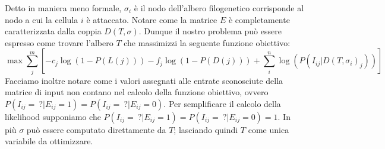 \documentclass{report}
\begin{document}
  Detto in maniera meno formale, ${\sigma}_{i}$ è il nodo dell'albero filogenetico corrisponde al nodo a cui la cellula $i$ è attaccato. Notare come la matrice $E$ è completamente caratterizzata dalla coppia $D(T, \sigma)$. Dunque il nostro problema può essere espresso come trovare l'albero $T$ che massimizzi la seguente funzione obiettivo:
  \[
    \max{\sum_{j}^{m}[-c_{j}\log(1-P(L(j)))-f_{j}\log(1-P(D(j)))+\sum_{i}^{n}\log(P(I_{ij}|D(T, \sigma_{i})_{j}))]}
  \]
  Facciamo inoltre notare come i valori assegnati alle entrate sconosciute della matrice di input non contano nel calcolo della funzione obiettivo, ovvero $P(I_{ij}=\ ?|E_{ij}=1)=P(I_{ij}=\ ?|E_{ij}=0)$. Per semplificare il calcolo della likelihood supponiamo che $P(I_{ij}=\ ?|E_{ij}=1)=P(I_{ij}=\ ?|E_{ij}=0)=1$.
  In più $\sigma$ può essere computato direttamente da $T$; lasciando quindi $T$ come unica variabile da ottimizzare.
\end{document}
